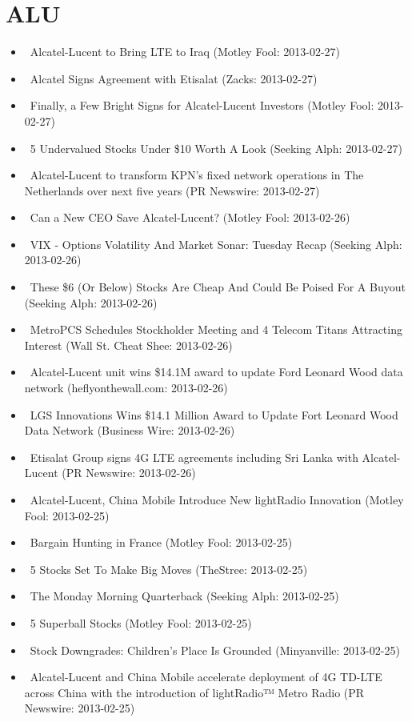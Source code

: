 \documentclass[11pt,asymmetric]{article}
\begin{document}
\section*{ALU}
\begin{itemize}
\item\ Alcatel-Lucent to Bring LTE to Iraq (Motley Fool: 2013-02-27)
\item\ Alcatel Signs Agreement with Etisalat (Zacks: 2013-02-27)
\item\ Finally, a Few Bright Signs for Alcatel-Lucent Investors (Motley Fool: 2013-02-27)
\item\ 5 Undervalued Stocks Under \$10 Worth A Look (Seeking Alph: 2013-02-27)
\item\ Alcatel-Lucent to transform KPN's fixed network operations in The Netherlands over next five years (PR Newswire: 2013-02-27)
\item\ Can a New CEO Save Alcatel-Lucent? (Motley Fool: 2013-02-26)
\item\ VIX - Options Volatility And Market Sonar: Tuesday Recap (Seeking Alph: 2013-02-26)
\item\ These \$6 (Or Below) Stocks Are Cheap And Could Be Poised For A Buyout (Seeking Alph: 2013-02-26)
\item\ MetroPCS Schedules Stockholder Meeting and 4 Telecom Titans Attracting Interest (Wall St. Cheat Shee: 2013-02-26)
\item\ Alcatel-Lucent unit wins \$14.1M award to update Ford Leonard Wood data network (heflyonthewall.com: 2013-02-26)
\item\ LGS Innovations Wins \$14.1 Million Award to Update Fort Leonard Wood Data Network (Business Wire: 2013-02-26)
\item\ Etisalat Group signs 4G LTE agreements including Sri Lanka with Alcatel-Lucent (PR Newswire: 2013-02-26)
\item\ Alcatel-Lucent, China Mobile Introduce New lightRadio Innovation (Motley Fool: 2013-02-25)
\item\ Bargain Hunting in France (Motley Fool: 2013-02-25)
\item\ 5 Stocks Set To Make Big Moves (TheStree: 2013-02-25)
\item\ The Monday Morning Quarterback (Seeking Alph: 2013-02-25)
\item\ 5 Superball Stocks (Motley Fool: 2013-02-25)
\item\ Stock Downgrades: Children's Place Is Grounded (Minyanville: 2013-02-25)
\item\ Alcatel-Lucent and China Mobile accelerate deployment of 4G TD-LTE across China with the introduction of lightRadio™ Metro Radio (PR Newswire: 2013-02-25)

\end{itemize}
\end{document}
